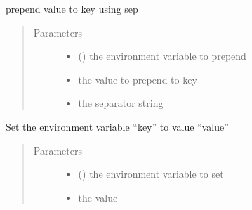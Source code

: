 \documentclass[a4paper,10pt,english]{sphinxmanual}
\begin{document}
\begin{fulllineitems}
\begin{fulllineitems}
\label{\detokenize{commands/apidoc/src:src.fileEnviron.ContextFileEnviron.prepend_value}}
prepend value to key using sep
\begin{quote}\begin{description}
\item[{Parameters}] \leavevmode\begin{itemize}
\item {} 
 () \textendash{} the environment variable to prepend

\item {} 
 \textendash{} the value to prepend to key

\item {} 
 \textendash{} the separator string

\end{itemize}

\end{description}\end{quote}

\end{fulllineitems}


\begin{fulllineitems}
\label{\detokenize{commands/apidoc/src:src.fileEnviron.ContextFileEnviron.set}}
Set the environment variable “key” to value “value”
\begin{quote}\begin{description}
\item[{Parameters}] \leavevmode\begin{itemize}
\item {} 
 () \textendash{} the environment variable to set

\item {} 
 \textendash{} the value

\end{itemize}

\end{description}\end{quote}

\end{fulllineitems}


\end{fulllineitems}
\end{document}
